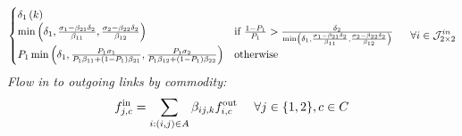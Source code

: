 \begin{subequations}
\begin{align}
\begin{cases}
	{\celldemand{1}{\itime}}
	\\
\min\left( \celldemandnt{1}{\itime}, {\frac{\cellsupplynt{1}{\itime} - \aggsplitrationt{2}{1}{k}\celldemandnt{2}{\itime}}{\aggsplitrationt{1}{1}{k}}},{\frac{\cellsupplynt{2}{\itime} - \aggsplitrationt{2}{2}{k}\celldemandnt{2}{\itime}}{\aggsplitrationt{1}{2}{k}}}\right)	& \text{if } \frac{1-\priority{1}}{\priority{1}} > \frac{{\celldemandnt{2}{\itime}}}{\min\left( \celldemandnt{1}{\itime}, {\frac{\cellsupplynt{1}{\itime} - \aggsplitrationt{2}{1}{k}\celldemandnt{2}{\itime}}{\aggsplitrationt{1}{1}{k}}},{\frac{\cellsupplynt{2}{\itime} - \aggsplitrationt{2}{2}{k}\celldemandnt{2}{\itime}}{\aggsplitrationt{1}{2}{k}}}\right)}
	\\
	\priority{1}\min\left( \celldemandnt{1}{\itime}, {\frac{\priority{1}\cellsupplynt{1}{\itime}}{\priority{1}\aggsplitrationt{1}{1}{k} + \left(1-\priority{1}\right)\aggsplitrationt{2}{1}{k}}},{\frac{\priority{1}\cellsupplynt{2}{\itime}}{\priority{1}\aggsplitrationt{1}{2}{k} + \left(1-\priority{1}\right)\aggsplitrationt{2}{2}{k}}}\right) & \text{otherwise }
	\end{cases} \ \ \ \ \forall{i\in{\cal J}^{in}_{2 \times 2}} 
	\label{eq:junctionFlowOutMaximization22}
	\end{align}
	\end{subequations}
	\indent \indent  \textit{Flow in to outgoing links by commodity:}
	\[
	\flowinmcnt{j}{k}{c} = \sum_{i:(i,j)\in A} \splitrationt{i}{j}{k}{c} \flowoutmcnt{i}{k}{c} \ \ \ \ \forall{j\in\{1,2\}, c\in C}
	\]
